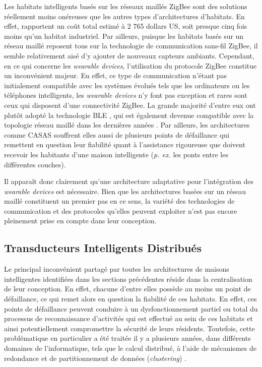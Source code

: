 Les habitats intelligents basés sur les réseaux maillés ZigBee sont des solutions réellement moins onéreuses que les autres types d'architectures d'habitats. En effet, \cite{Cook2013} rapportent un coût total estimé à 2 765 dollars US, soit presque cinq fois moins qu'un habitat industriel. Par ailleurs, puisque les habitats basés sur un réseau maillé reposent tous sur la technologie de communication sans-fil ZigBee, il semble relativement aisé d'y ajouter de nouveaux capteurs ambiants. Cependant, en ce qui concerne les \textit{wearable devices}, l'utilisation du protocole ZigBee constitue un inconvénient majeur. En effet, ce type de communication n'étant pas initialement compatible avec les systèmes évolués tels que les ordinateurs ou les téléphones intelligents, les \textit{wearable devices} n'y font pas exception et rares sont ceux qui disposent d'une connectivité ZigBee. La grande majorité d'entre eux ont plutôt adopté la technologie \ac{BLE} \citep{Martin2014}, qui est également devenue compatible avec la topologie réseau maillé dans les dernières années \citep{Bluetooth2017}. Par ailleurs, les architectures comme CASAS souffrent elles aussi de plusieurs points de défaillance qui remettent en question leur fiabilité quant à l'assistance rigoureuse que doivent recevoir les habitants d'une maison intelligente (\textit{p. ex.} les ponts entre les différentes couches).

Il apparaît donc clairement qu'une architecture adaptative pour l'intégration des \textit{wearable devices} est nécessaire. Bien que les architectures basées sur un réseau maillé constituent un premier pas en ce sens, la variété des technologies de communication et des protocoles qu'elles peuvent exploiter n'est pas encore pleinement prise en compte dans leur conception.

\subsection{Transducteurs Intelligents Distribués}

Le principal inconvénient partagé par toutes les architectures de maisons intelligentes identifiées dans les sections précédentes réside dans la centralisation de leur conception. En effet, chacune d'entre elles possède au moins un point de défaillance, ce qui remet alors en question la fiabilité de ces habitats. En effet, ces points de défaillance peuvent conduire à un dysfonctionnement partiel ou total du processus de reconnaissance d'activités qui est effectué au sein de ces habitats et ainsi potentiellement compromettre la sécurité de leurs résidents. Toutefois, cette problématique en particulier a été traitée il y a plusieurs années, dans différents domaines de l'informatique, tels que le calcul distribué, à l'aide de mécanismes de redondance et de partitionnement de données (\textit{clustering}) \citep{Dikaiakos2009,Zaharia2010,JafarnejadGhomi2017}.

